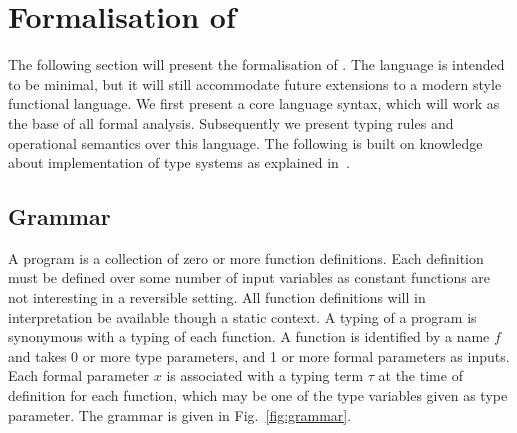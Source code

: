 
\newcommand{\alignspace}{\vspace{-4mm}}

\chapter{Formalisation of \rfunc}\label{sec:formal}

The following section will present the formalisation of \rfunc. The language is
intended to be minimal, but it will still accommodate future extensions to a
modern style functional language. We first present a core language syntax,
which will work as the base of all formal analysis. Subsequently we present
typing rules and operational semantics over this language. The following is
built on knowledge about implementation of type systems as explained
in~\cite{Pierce:2002:TPL}.

\section{Grammar}

A program is a collection of zero or more function definitions. Each definition
must be defined over some number of input variables as constant functions are
not interesting in a reversible setting. All function definitions will in
interpretation be available though a static context.  A typing of a program is
synonymous with a typing of each function. A function is identified by a name
$f$ and takes 0 or more type parameters, and 1 or more formal parameters as
inputs. Each formal parameter $x$ is associated with a typing term $\tau$ at
the time of definition for each function, which may be one of the type
variables given as type parameter.  The grammar is given in
Fig.~\ref{fig:grammar}.

